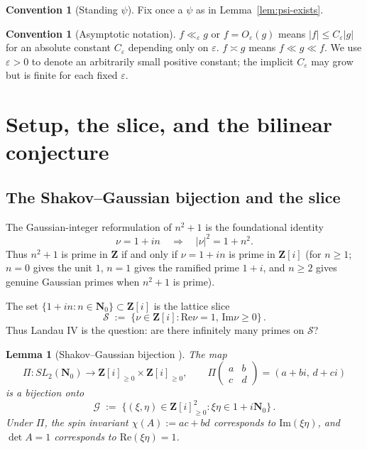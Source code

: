 \documentclass[11pt]{article}
\newtheorem{lemma}[theorem]{Lemma}
\theoremstyle{definition}
\newtheorem{convention}[theorem]{Convention}
\newcommand{\Nz}{\mathbf{N}_0}
\newcommand{\Z}{\mathbf{Z}}
\newcommand{\Zi}{\Z[i]}
\renewcommand{\Re}{\mathrm{Re}}
\renewcommand{\Im}{\mathrm{Im}}
\begin{document}
\begin{convention}[Standing $\psi$]\label{conv:psi}
Fix once a $\psi$ as in Lemma~\ref{lem:psi-exists}.
\end{convention}

\begin{convention}[Asymptotic notation]\label{conv:asymp}
$f\ll_\varepsilon g$ or $f=O_\varepsilon(g)$ means $|f|\le C_\varepsilon|g|$ for an absolute constant $C_\varepsilon$ depending only on $\varepsilon$. $f\asymp g$ means $f\ll g\ll f$. We use $\varepsilon>0$ to denote an arbitrarily small positive constant; the implicit $C_\varepsilon$ may grow but is finite for each fixed $\varepsilon$.
\end{convention}

\section{Setup, the slice, and the bilinear conjecture}\label{sec:setup}

\subsection{The Shakov--Gaussian bijection and the slice}\label{ssec:shakov-gaussian}

The Gaussian-integer reformulation of $n^2+1$ is the foundational identity
\begin{equation}\label{eq:nu-norm}
   \nu=1+in\quad\Longrightarrow\quad|\nu|^2=1+n^2.
\end{equation}
Thus $n^2+1$ is prime in $\Z$ if and only if $\nu=1+in$ is prime in $\Zi$ (for $n\ge 1$; $n=0$ gives the unit $1$, $n=1$ gives the ramified prime $1+i$, and $n\ge 2$ gives genuine Gaussian primes when $n^2+1$ is prime).

The set $\{1+in:n\in\Nz\}\subset\Zi$ is the lattice slice
\begin{equation}\label{eq:slice}
   \mathcal S\;:=\;\{\nu\in\Zi:\Re\nu=1,\,\Im\nu\ge 0\}\,.
\end{equation}
Thus Landau IV is the question: are there infinitely many primes on $\mathcal S$?

\begin{lemma}[Shakov--Gaussian bijection {\cite[Lemma 1.1]{P11}}]\label{lem:shakov-gaussian}
The map
\[
   \Pi:SL_2(\Nz)\to\Zi_{\ge 0}\times\Zi_{\ge 0},\qquad\Pi\!\begin{pmatrix}a&b\\c&d\end{pmatrix}=(a+bi,\,d+ci)
\]
is a bijection onto
\[
   \mathcal G\;:=\;\{(\xi,\eta)\in\Zi_{\ge 0}^2:\xi\eta\in 1+i\Nz\}\,.
\]
Under $\Pi$, the spin invariant $\chi(A):=ac+bd$ corresponds to $\Im(\xi\eta)$, and $\det A=1$ corresponds to $\Re(\xi\eta)=1$.
\end{lemma}
\end{document}
